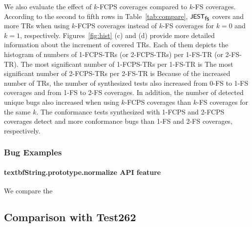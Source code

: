 We also evaluate the effect of $k$-FCPS coverages compared to $k$-FS coverages.
%
According to the second to fifth rows in Table~\ref{tab:compare}, $\textsf{\small JEST}_{\textsf{\small fs}}$ covers
 and  more TRs when
using $k$-FCPS coverages instead of $k$-FS coverages for $k = 0$ and $k = 1$,
respectively.
%
Figures~\ref{fig:hist} (c) and (d) provide more detailed information about the
increment of covered TRs.
%
Each of them depicts the histogram of numbers of 1-FCPS-TRs (or 2-FCPS-TRs) per
1-FS-TR (or 2-FS-TR).
%
The most significant number of 1-FCPS-TRs per 1-FS-TR is 
%
%
The most significant number of 2-FCPS-TRs per 2-FS-TR is 
%
Because of the increased number of TRs, the number of synthesized tests also
increased  from 0-FS to 1-FS coverages and
 from 1-FS to 2-FS coverages.
%
In addition, the number of detected unique bugs also increased when using
$k$-FCPS coverages than $k$-FS coverages for the same $k$.
%
The conformance tests synthesized with 1-FCPS and 2-FCPS coverages detect
 and  more conformance bugs than 
1-FS and 2-FS coverages, respectively.


\subsubsection{Bug Examples}\label{sec:k-fs-example}

\paragraph{textbf{String.prototype.normalize API feature}}

We compare the 

\todo


\subsection{Comparison with Test262}\label{sec:compare-test262}

